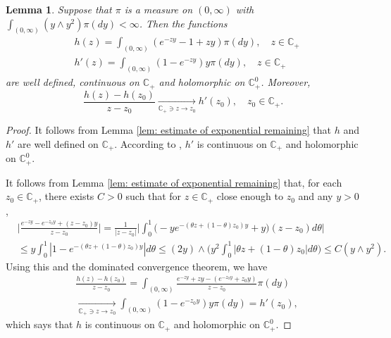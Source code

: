 \documentclass[12pt,a4paper]{amsart}
\theoremstyle{plain}
\newtheorem{lem}[thm]{Lemma}
\theoremstyle{definition}
\numberwithin{equation}{section}
\begin{document}
\begin{lem}
  \label{lem: extension lemma for branching mechanism}
  Suppose that  $\pi$ is a measure on $(0,\infty)$ with $\int_{(0,\infty)} (y \wedge y^2) \pi(dy)< \infty$.
  Then the functions
  \begin{align}
    & h (z) 
      = \int_{(0,\infty)} (e^{-zy} - 1 + zy) \pi(dy), \quad z \in \mathbb C_+
    \\ & h'(z) 
         = \int_{(0,\infty)}(1- e^{-zy})y \pi(dy), \quad z \in \mathbb C_+
  \end{align}
  are well defined, continuous on $\mathbb C_+$ and holomorphic on $\mathbb C_+^0$.
  Moreover,
  \[
    \frac{h(z)-h(z_0)}{z-z_0} 
    \xrightarrow[\mathbb C_+\ni z \to z_0]{} h'(z_0),\quad z_0 \in \mathbb C_+.
  \]
\end{lem}
\begin{proof}
  It follows from Lemma \ref{lem: estimate of exponential remaining} that $h$ and $h'$ are well defined on $\mathbb C_+$.
  According to \cite[Theorems 3.2. \& Proposition 3.6]{SchillingSongVondravcek2010Bernstein}, $h'$ is continuous on $\mathbb C_+$ and holomorphic on $\mathbb C_+^0$.
  
  It follows from Lemma \ref{lem: estimate of exponential remaining} that, for each $z_0 \in \mathbb C_+$,  there exists $C>0$ such that for $z \in \mathbb C_+$ close enough to $z_0$ and any $y>0$,
\begin{align}
  & \Big| \frac{e^{-zy} - e^{-z_0 y}+(z-z_0) y}{z-z_0} \Big|
    = \frac{1}{|z-z_0|}\Big| \int_0^1 \big(-y e^{-(\theta z+(1-\theta)z_0)y}+y\big)(z-z_0)d\theta\Big| \\ 
  & \leq y\int_0^1 |1-e^{-(\theta z +(1-\theta)z_0)y}| d\theta
    \leq (2y) \wedge\Big( y^2\int_0^1|\theta z+(1-\theta)z_0|d\theta\Big)
    \leq C(y\wedge y^2).
\end{align}
Using this and the dominated convergence theorem, we have
\begin{align}
  & \frac{h(z)-h(z_0)}{z-z_0} = \int_{(0,\infty)} \frac{e^{-zy}+zy -(e^{-z_0 y}+z_0 y)}{z-z_0}  \pi(dy) \\
  & \xrightarrow[\mathbb C_+\ni z\to z_0]{} \int_{(0,\infty)}(1 - e^{-z_0 y} )y\pi(dy) = h'(z_0),
\end{align}
which says that $h$ is continuous on $\mathbb C_+$ and holomorphic on $\mathbb C_+^0$.
\end{proof}
\end{document}

